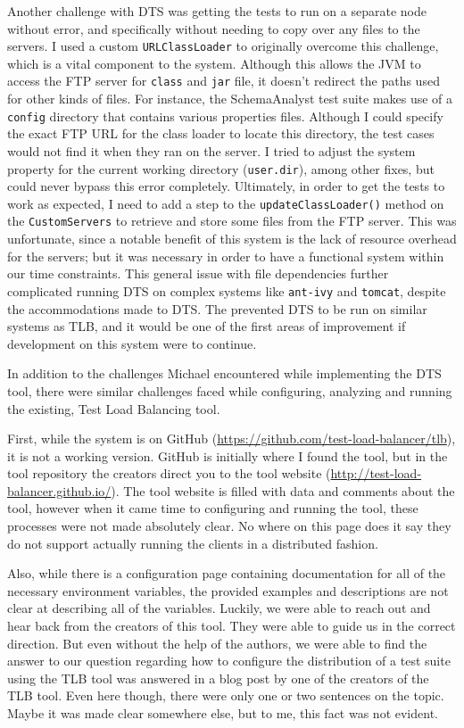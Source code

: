\documentclass{article}
\begin{document}
{Another challenge with DTS was getting the tests to run on a separate node without error, and specifically without needing to copy over any files to the servers.  I used a custom \texttt{URLClassLoader} to originally overcome this challenge, which is a vital component to the system.  Although this allows the JVM to access the FTP server for \texttt{class} and \texttt{jar} file, it doesn't redirect the paths used for other kinds of files.  For instance, the SchemaAnalyst test suite makes use of a \texttt{config} directory that contains various properties files.  Although I could specify the exact FTP URL for the class loader to locate this directory, the test cases would not find it when they ran on the server.  I tried to adjust the system property for the current working directory (\texttt{user.dir}), among other fixes, but could never bypass this error completely.  Ultimately, in order to get the tests to work as expected, I need to add a step to the \texttt{updateClassLoader()} method on the \texttt{CustomServers} to retrieve and store some files from the FTP server.  This was unfortunate, since a notable benefit of this system is the lack of resource overhead for the servers; but it was necessary in order to have a functional system within our time constraints.  This general issue with file dependencies further complicated running DTS on complex systems like \texttt{ant-ivy} and \texttt{tomcat}, despite the accommodations made to DTS.  The prevented DTS to be run on similar systems as TLB, and it would be one of the first areas of improvement if development on this system were to continue.

In addition to the challenges Michael encountered while implementing the DTS tool, there were similar challenges
faced while configuring, analyzing and running the existing, Test Load Balancing tool.

First, while the system is on GitHub (\url{https://github.com/test-load-balancer/tlb}), it is not a working version. GitHub is initially where I found the tool, but in the
tool repository the creators direct you to the tool website (\url{http://test-load-balancer.github.io/}). The tool website is
filled with data and comments about the tool, however when it came time to configuring and running the tool, these
processes were not made absolutely clear. No where on this page does it say they do not support actually running the
clients in a distributed fashion.

Also, while there is a configuration page containing documentation for all of the necessary environment variables,
the provided examples and descriptions are not clear at describing all of the variables. Luckily, we were
able to reach out and hear back from the creators of this tool. They were able to guide us in the correct
direction. But even without the help of the authors, we were able to find the answer to our question
regarding how to configure the distribution of a test suite using the TLB tool was answered in a blog
post by one of the creators of the TLB tool. Even here though, there were only one or two sentences
on the topic. Maybe it was made clear somewhere else, but to me, this fact was not evident.

}
\end{document}
